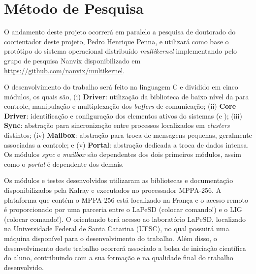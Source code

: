 \documentclass[
	12pt,				%
	openright,			%
	twoside,			%
	a4paper,			%
	english,			%
	brazil,				%
	]{abntex2}
\begin{document}
\chapter{Método de Pesquisa}
\label{cap:metodo-pesquisa}

    O andamento deste projeto ocorrerá em paralelo a pesquisa de doutorado do coorientador deste projeto, Pedro Henrique Penna, e utilizará como base o protótipo do sistema operacional distribuído \textit{multikernel} implementando pelo grupo de pesquisa Nanvix \cite{Penna2017,Penna2017-1} disponibilizado em \url{https://github.com/nanvix/multikernel}.
    
    O desenvolvimento do trabalho será feito na linguagem C e dividido em cinco módulos, os quais são,
    (i) \textbf{\noc Driver}: utilização da biblioteca de baixo nível da \noc para controle, manipulação e multiplexação dos \textit{buffers} de comunicação;
    (ii) \textbf{Core Driver}: identificação e configuração dos elementos ativos do sistemas (\ioclusters e \cpclusters); 
    (iii) \textbf{Sync}: abstração para sincronização entre processos localizados em \textit{clusters} distintos;
    (iv) \textbf{Mailbox}: abstração para troca de mensagens pequenas, geralmente associadas a controle; e 
    (v) \textbf{Portal}: abstração dedicada a troca de dados intensa. Os módulos \textit{sync} e \textit{mailbox} são dependentes dos dois primeiros módulos, assim como o \textit{portal} é dependente dos demais.
    
    Os módulos e testes desenvolvidos utilizaram as bibliotecas e documentação disponibilizados pela Kalray e executados no processador MPPA-256.
    A plataforma que contém o MPPA-256 está localizado na França e o acesso remoto é proporcionado por uma parceria entre o LaPeSD (colocar comando!) e o LIG (colocar comando!).
    O orientando terá acesso ao laboratório LaPeSD, localizado na Universidade Federal de Santa Catarina (UFSC), no qual possuirá uma máquina disponível para o desenvolvimento do trabalho.
    Além disso, o desenvolvimento deste trabalho ocorrerá associado a bolsa de iniciação científica do aluno, contribuindo com a sua formação e na qualidade final do trabalho desenvolvido.

\end{document}
